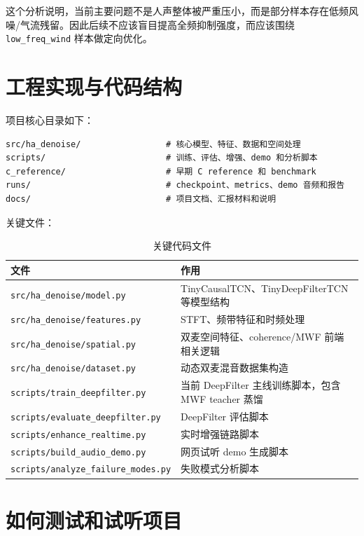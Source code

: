 \documentclass[UTF8,12pt,a4paper]{ctexart}
\begin{document}
这个分析说明，当前主要问题不是人声整体被严重压小，而是部分样本存在低频风噪/气流残留。因此后续不应该盲目提高全频抑制强度，而应该围绕 \texttt{low\_freq\_wind} 样本做定向优化。

\section{工程实现与代码结构}

项目核心目录如下：

\begin{lstlisting}
src/ha_denoise/                 # 核心模型、特征、数据和空间处理
scripts/                        # 训练、评估、增强、demo 和分析脚本
c_reference/                    # 早期 C reference 和 benchmark
runs/                           # checkpoint、metrics、demo 音频和报告
docs/                           # 项目文档、汇报材料和说明
\end{lstlisting}

关键文件：

\begin{table}[H]
\centering
\caption{关键代码文件}
\label{tab:files}
\begin{tabularx}{\textwidth}{p{5.2cm}X}
\toprule
\textbf{文件} & \textbf{作用} \\
\midrule
\texttt{src/ha\_denoise/model.py} & TinyCausalTCN、TinyDeepFilterTCN 等模型结构 \\
\texttt{src/ha\_denoise/features.py} & STFT、频带特征和时频处理 \\
\texttt{src/ha\_denoise/spatial.py} & 双麦空间特征、coherence/MWF 前端相关逻辑 \\
\texttt{src/ha\_denoise/dataset.py} & 动态双麦混音数据集构造 \\
\texttt{scripts/train\_deepfilter.py} & 当前 DeepFilter 主线训练脚本，包含 MWF teacher 蒸馏 \\
\texttt{scripts/evaluate\_deepfilter.py} & DeepFilter 评估脚本 \\
\texttt{scripts/enhance\_realtime.py} & 实时增强链路脚本 \\
\texttt{scripts/build\_audio\_demo.py} & 网页试听 demo 生成脚本 \\
\texttt{scripts/analyze\_failure\_modes.py} & 失败模式分析脚本 \\
\bottomrule
\end{tabularx}
\end{table}

\section{如何测试和试听项目}
\end{document}
